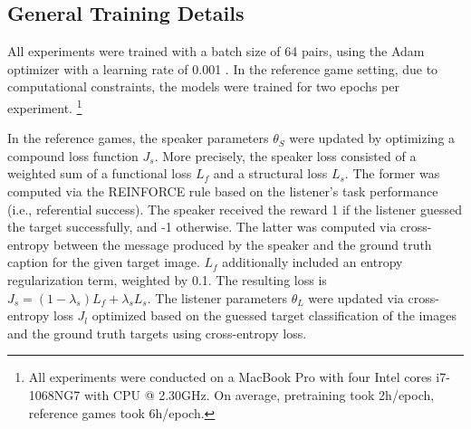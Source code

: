 \subsection{General Training Details}

All experiments were trained with a batch size of 64 pairs, using the Adam optimizer with a learning rate  of 0.001 \parencite{kingma2014adam}. In the reference game setting, due to computational constraints, the models were trained for two epochs per experiment. \footnote{All experiments were conducted on a MacBook Pro with four Intel cores i7-1068NG7 with CPU @ 2.30GHz. On average, pretraining took 2h/epoch, reference games took 6h/epoch.} 

In the reference games, the speaker parameters $\theta_S$ were updated by optimizing a compound loss function $J_s$. More precisely, the speaker loss consisted of a weighted sum of a functional loss $L_f$ and a structural loss $L_s$. The former was computed via the REINFORCE rule based on the listener's task performance (i.e., referential success). The speaker received the reward 1 if the listener guessed the target successfully, and -1 otherwise. The latter was computed via cross-entropy between the message produced by the speaker and the ground truth caption for the given target image. $L_f$ additionally included an entropy regularization term, weighted by 0.1. The resulting loss is $J_s = (1-\lambda_s)L_f + \lambda_s L_s$. 
The listener parameters $\theta_L$ were updated via cross-entropy loss $J_l$ optimized based on the guessed target classification of the images and the ground truth targets using cross-entropy loss. 

